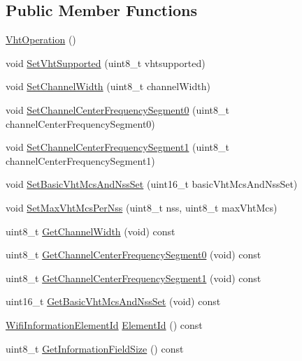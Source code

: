 \subsection*{Public Member Functions}
\begin{DoxyCompactItemize}
\item 
\hyperlink{classns3_1_1VhtOperation_aff5f335b798bc6d1f898465e56c43f05}{Vht\+Operation} ()
\item 
void \hyperlink{classns3_1_1VhtOperation_a980ec5c335d0cb044adec091795f7683}{Set\+Vht\+Supported} (uint8\+\_\+t vhtsupported)
\item 
void \hyperlink{classns3_1_1VhtOperation_acca344311c17ff702e015de659ab83fb}{Set\+Channel\+Width} (uint8\+\_\+t channel\+Width)
\item 
void \hyperlink{classns3_1_1VhtOperation_afd18e87ae7413889800feba8d795a190}{Set\+Channel\+Center\+Frequency\+Segment0} (uint8\+\_\+t channel\+Center\+Frequency\+Segment0)
\item 
void \hyperlink{classns3_1_1VhtOperation_ae83b0adf042b8080abaf67a53e9133b2}{Set\+Channel\+Center\+Frequency\+Segment1} (uint8\+\_\+t channel\+Center\+Frequency\+Segment1)
\item 
void \hyperlink{classns3_1_1VhtOperation_abac06245d7ce6f4fde2d2f2221d4ad95}{Set\+Basic\+Vht\+Mcs\+And\+Nss\+Set} (uint16\+\_\+t basic\+Vht\+Mcs\+And\+Nss\+Set)
\item 
void \hyperlink{classns3_1_1VhtOperation_a5fce0f909a4ab65bef59c680e7307890}{Set\+Max\+Vht\+Mcs\+Per\+Nss} (uint8\+\_\+t nss, uint8\+\_\+t max\+Vht\+Mcs)
\item 
uint8\+\_\+t \hyperlink{classns3_1_1VhtOperation_ae2b1c469cb6b0495928d77980731ed83}{Get\+Channel\+Width} (void) const 
\item 
uint8\+\_\+t \hyperlink{classns3_1_1VhtOperation_a5af5c4122c935eafafbcea1c198939eb}{Get\+Channel\+Center\+Frequency\+Segment0} (void) const 
\item 
uint8\+\_\+t \hyperlink{classns3_1_1VhtOperation_aa5370564314a3ed083fce0722918e01f}{Get\+Channel\+Center\+Frequency\+Segment1} (void) const 
\item 
uint16\+\_\+t \hyperlink{classns3_1_1VhtOperation_aa2d3a9a28c5f0b1de031e98f7a93a1bd}{Get\+Basic\+Vht\+Mcs\+And\+Nss\+Set} (void) const 
\item 
\hyperlink{namespacens3_aeb185e0c8a60816016bca079f1420478}{Wifi\+Information\+Element\+Id} \hyperlink{classns3_1_1VhtOperation_adba3860d336d222b75c9714e42489057}{Element\+Id} () const 
\item 
uint8\+\_\+t \hyperlink{classns3_1_1VhtOperation_a6c7ded68c2dc752e93a1f46a6949ddbd}{Get\+Information\+Field\+Size} () const 

\end{DoxyCompactItemize}
